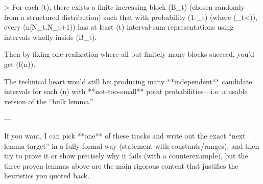 > For each (t), there exists a finite increasing block (B_t) (chosen randomly from a structured distribution) such that with probability (1-\varepsilon_t) (where (\sum \varepsilon_t<\infty)), every (n\in[N_t,N_{t+1})) has at least (t) interval-sum representations using intervals wholly inside (B_t).

Then by fixing one realization where all but finitely many blocks succeed, you’d get (f(n)\to\infty).

The technical heart would still be: producing many **independent** candidate intervals for each (n) with **not-too-small** point probabilities—i.e. a usable version of the “bulk lemma.”

---

If you want, I can pick **one** of these tracks and write out the exact “next lemma target” in a fully formal way (statement with constants/ranges), and then try to prove it or show precisely why it fails (with a counterexample), but the three proven lemmas above are the main rigorous content that justifies the heuristics you quoted back.
